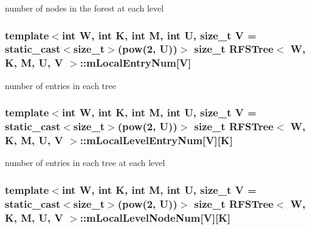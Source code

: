 number of nodes in the forest at each level 

\hypertarget{classRFSTree_a59097191ae5e2c7984d4f49d1c7835de}{
\subsubsection[{m\-Local\-Entry\-Num}]{\setlength{\rightskip}{0pt plus 5cm}template$<$int W, int K, int M, int U, size\-\_\-t V = static\-\_\-cast$<$size\-\_\-t$>$(pow(2, U))$>$ size\-\_\-t {\bf R\-F\-S\-Tree}$<$ {\bf W}, K, M, U, V $>$\-::m\-Local\-Entry\-Num\mbox{[}V\mbox{]}\hspace{0.3cm}{\ttfamily [private]}}}\label{classRFSTree_a59097191ae5e2c7984d4f49d1c7835de}


number of entries in each tree 

\hypertarget{classRFSTree_a4ed6fa6f24399b7a7b9ccb30c208b38f}{
\subsubsection[{m\-Local\-Level\-Entry\-Num}]{\setlength{\rightskip}{0pt plus 5cm}template$<$int W, int K, int M, int U, size\-\_\-t V = static\-\_\-cast$<$size\-\_\-t$>$(pow(2, U))$>$ size\-\_\-t {\bf R\-F\-S\-Tree}$<$ {\bf W}, K, M, U, V $>$\-::m\-Local\-Level\-Entry\-Num\mbox{[}V\mbox{]}\mbox{[}K\mbox{]}\hspace{0.3cm}{\ttfamily [private]}}}\label{classRFSTree_a4ed6fa6f24399b7a7b9ccb30c208b38f}


number of entries in each tree at each level 

\hypertarget{classRFSTree_a18ce6b5d6d9d42b5f7528f13e380b944}{
\subsubsection[{m\-Local\-Level\-Node\-Num}]{\setlength{\rightskip}{0pt plus 5cm}template$<$int W, int K, int M, int U, size\-\_\-t V = static\-\_\-cast$<$size\-\_\-t$>$(pow(2, U))$>$ size\-\_\-t {\bf R\-F\-S\-Tree}$<$ {\bf W}, K, M, U, V $>$\-::m\-Local\-Level\-Node\-Num\mbox{[}V\mbox{]}\mbox{[}K\mbox{]}\hspace{0.3cm}{\ttfamily [private]}}}\label{classRFSTree_a18ce6b5d6d9d42b5f7528f13e380b944}


